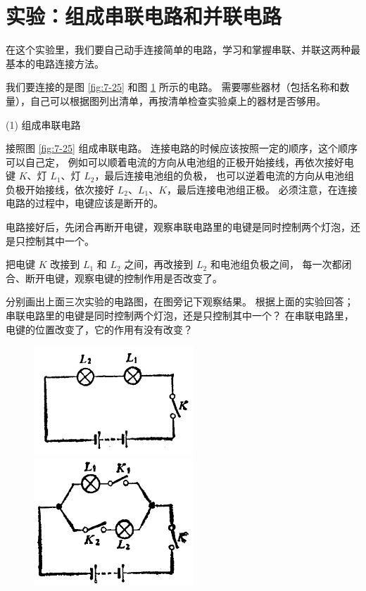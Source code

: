 \section{实验：组成串联电路和并联电路}\label{sec:7-8}

在这个实验里，我们要自己动手连接简单的电路，学习和掌握串联、并联这两种最基本的电路连接方法。

我们要连接的是图 \ref{fig:7-25} 和图 \ref{fig:7-26} 所示的电路。
需要哪些器材（包括名称和数量），自己可以根据图列出清单，再按清单检查实验桌上的器材是否够用。

(1) 组成串联电路

接照图 \ref{fig:7-25} 组成串联电路。
连接电路的时候应该按照一定的顺序，这个顺序可以自己定，
例如可以顺着电流的方向从电池组的正极开始接线，再依次接好电键 $K$、灯 $L_1$、灯 $L_2$，最后连接电池组的负极，
也可以逆着电流的方向从电池组负极开始接线，依次接好 $L_2$、$L_1$、$K$，最后连接电池组正极。
必须注意，在连接电路的过程中，电键应该是断开的。

电路接好后，先闭合再断开电键，观察串联电路里的电键是同时控制两个灯泡，还是只控制其中一个。

把电键 $K$ 改接到 $L_1$ 和 $L_2$ 之间，再改接到 $L_2$ 和电池组负极之间，
每一次都闭合、断开电键，观察电键的控制作用是否改变了。

分别画出上面三次实验的电路图，在图旁记下观察结果。
根据上面的实验回答；串联电路里的电键是同时控制两个灯泡，还是只控制其中一个？
在串联电路里，电键的位置改变了，它的作用有没有改变？

\begin{figure}[htbp]
    \centering
    \begin{minipage}{7cm}
    \centering
    \includegraphics[width=6cm]{../pic/czwl2-ch7-25}
    \caption{}\label{fig:7-25}
    \end{minipage}
    \qquad
    \begin{minipage}{7cm}
    \centering
    \includegraphics[width=6cm]{../pic/czwl2-ch7-26}
    \caption{}\label{fig:7-26}
    \end{minipage}
\end{figure}


